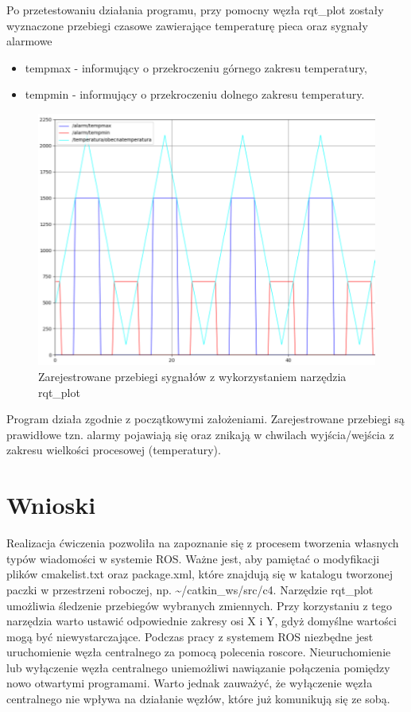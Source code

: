 \documentclass[10pt,a4paper,twoside,twocolumn]{article}%
\begin{document}
Po przetestowaniu działania programu, przy pomocny węzła rqt\_plot zostały
wyznaczone przebiegi czasowe zawierające temperaturę pieca oraz sygnały alarmowe
\begin{itemize}
    \item tempmax - informujący o przekroczeniu górnego zakresu temperatury,
    \item tempmin - informujący o przekroczeniu dolnego zakresu temperatury.
\end{itemize}


\begin{figure}[H]
    \centering
    \includegraphics[width=\linewidth]{8.png}
    \caption{Zarejestrowane przebiegi sygnałów z wykorzystaniem narzędzia rqt\_plot}
\end{figure}

Program działa zgodnie z początkowymi założeniami. Zarejestrowane przebiegi są
prawidłowe tzn. alarmy pojawiają się oraz znikają w chwilach wyjścia/wejścia z
zakresu wielkości procesowej (temperatury).

\section{Wnioski}
Realizacja ćwiczenia pozwoliła na zapoznanie się z procesem tworzenia własnych
typów wiadomości w systemie ROS. Ważne jest, aby pamiętać o modyfikacji plików
cmakelist.txt oraz package.xml, które znajdują się w katalogu tworzonej paczki w
przestrzeni roboczej, np. \textasciitilde /catkin\_ws/src/c4. Narzędzie
rqt\_plot umożliwia śledzenie przebiegów wybranych zmiennych. Przy korzystaniu z
tego narzędzia warto ustawić odpowiednie zakresy osi X i Y, gdyż domyślne
wartości mogą być niewystarczające. Podczas pracy z systemem ROS niezbędne jest
uruchomienie węzła centralnego za pomocą polecenia roscore. Nieuruchomienie lub
wyłączenie węzła centralnego uniemożliwi nawiązanie połączenia pomiędzy nowo
otwartymi programami. Warto jednak zauważyć, że wyłączenie węzła centralnego nie
wpływa na działanie węzłów, które już komunikują się ze sobą.
\end{document}
